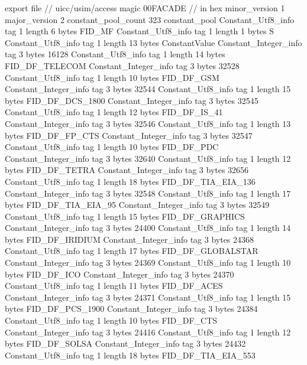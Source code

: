 export file {		// uicc/usim/access
	magic	00FACADE		 // in hex
	minor_version	1
	major_version	2
	constant_pool_count	323
	constant_pool {
		Constant_Utf8_info {
			tag	1
			length	6
			bytes	FID_MF
		}
		Constant_Utf8_info {
			tag	1
			length	1
			bytes	S
		}
		Constant_Utf8_info {
			tag	1
			length	13
			bytes	ConstantValue
		}
		Constant_Integer_info {
			tag	3
			bytes	16128
		}
		Constant_Utf8_info {
			tag	1
			length	14
			bytes	FID_DF_TELECOM
		}
		Constant_Integer_info {
			tag	3
			bytes	32528
		}
		Constant_Utf8_info {
			tag	1
			length	10
			bytes	FID_DF_GSM
		}
		Constant_Integer_info {
			tag	3
			bytes	32544
		}
		Constant_Utf8_info {
			tag	1
			length	15
			bytes	FID_DF_DCS_1800
		}
		Constant_Integer_info {
			tag	3
			bytes	32545
		}
		Constant_Utf8_info {
			tag	1
			length	12
			bytes	FID_DF_IS_41
		}
		Constant_Integer_info {
			tag	3
			bytes	32546
		}
		Constant_Utf8_info {
			tag	1
			length	13
			bytes	FID_DF_FP_CTS
		}
		Constant_Integer_info {
			tag	3
			bytes	32547
		}
		Constant_Utf8_info {
			tag	1
			length	10
			bytes	FID_DF_PDC
		}
		Constant_Integer_info {
			tag	3
			bytes	32640
		}
		Constant_Utf8_info {
			tag	1
			length	12
			bytes	FID_DF_TETRA
		}
		Constant_Integer_info {
			tag	3
			bytes	32656
		}
		Constant_Utf8_info {
			tag	1
			length	18
			bytes	FID_DF_TIA_EIA_136
		}
		Constant_Integer_info {
			tag	3
			bytes	32548
		}
		Constant_Utf8_info {
			tag	1
			length	17
			bytes	FID_DF_TIA_EIA_95
		}
		Constant_Integer_info {
			tag	3
			bytes	32549
		}
		Constant_Utf8_info {
			tag	1
			length	15
			bytes	FID_DF_GRAPHICS
		}
		Constant_Integer_info {
			tag	3
			bytes	24400
		}
		Constant_Utf8_info {
			tag	1
			length	14
			bytes	FID_DF_IRIDIUM
		}
		Constant_Integer_info {
			tag	3
			bytes	24368
		}
		Constant_Utf8_info {
			tag	1
			length	17
			bytes	FID_DF_GLOBALSTAR
		}
		Constant_Integer_info {
			tag	3
			bytes	24369
		}
		Constant_Utf8_info {
			tag	1
			length	10
			bytes	FID_DF_ICO
		}
		Constant_Integer_info {
			tag	3
			bytes	24370
		}
		Constant_Utf8_info {
			tag	1
			length	11
			bytes	FID_DF_ACES
		}
		Constant_Integer_info {
			tag	3
			bytes	24371
		}
		Constant_Utf8_info {
			tag	1
			length	15
			bytes	FID_DF_PCS_1900
		}
		Constant_Integer_info {
			tag	3
			bytes	24384
		}
		Constant_Utf8_info {
			tag	1
			length	10
			bytes	FID_DF_CTS
		}
		Constant_Integer_info {
			tag	3
			bytes	24416
		}
		Constant_Utf8_info {
			tag	1
			length	12
			bytes	FID_DF_SOLSA
		}
		Constant_Integer_info {
			tag	3
			bytes	24432
		}
		Constant_Utf8_info {
			tag	1
			length	18
			bytes	FID_DF_TIA_EIA_553
}}}
